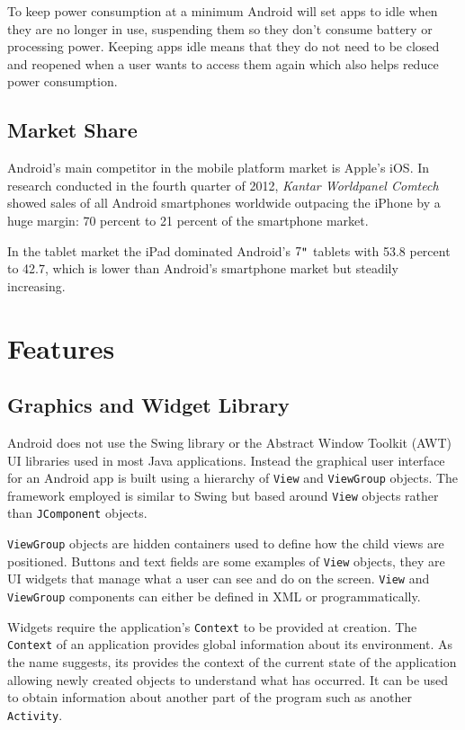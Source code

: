 \documentclass{report}
\begin{document}
To keep power consumption at a minimum Android will set apps to idle when they are no longer in use, suspending them so they don't consume battery or processing power. Keeping apps idle means that they do not need to be closed and reopened when a user wants to access them again which also helps reduce power consumption.

\subsection{Market Share}

Android's main competitor in the mobile platform market is Apple's iOS. In research conducted in the fourth quarter of 2012, \emph{Kantar Worldpanel Comtech} showed sales of all Android smartphones worldwide outpacing the iPhone by a huge margin: 70 percent to 21 percent of the smartphone market\cite{androidstats}.

In the tablet market the iPad dominated Android's $7\verb+"+$ tablets with 53.8 percent to 42.7, which is lower than Android's smartphone market but steadily increasing\cite{marketshare}.

\section{Features}

\subsection{Graphics and Widget Library}
\label{sub:graphics_and_widgets}

Android does not use the Swing library or the Abstract Window Toolkit (AWT) UI libraries used in most Java applications. Instead the graphical user interface for an Android app is built using a hierarchy of {\tt View} and {\tt ViewGroup} objects. The framework employed is similar to Swing but based around {\tt View} objects rather than {\tt JComponent} objects.

{\tt ViewGroup} objects are hidden containers used to define how the child views are positioned. Buttons and text fields are some examples of {\tt View} objects, they are UI widgets that manage what a user can see and do on the screen. {\tt View} and {\tt ViewGroup} components can either be defined in XML or programmatically.

Widgets require the application's {\tt Context} to be provided at creation. The {\tt Context} of an application provides global information about its environment. As the name suggests, its provides the context of the current state of the application allowing newly created objects to understand what has occurred. It can be used to obtain information about another part of the program such as another {\tt Activity}.
\end{document}
